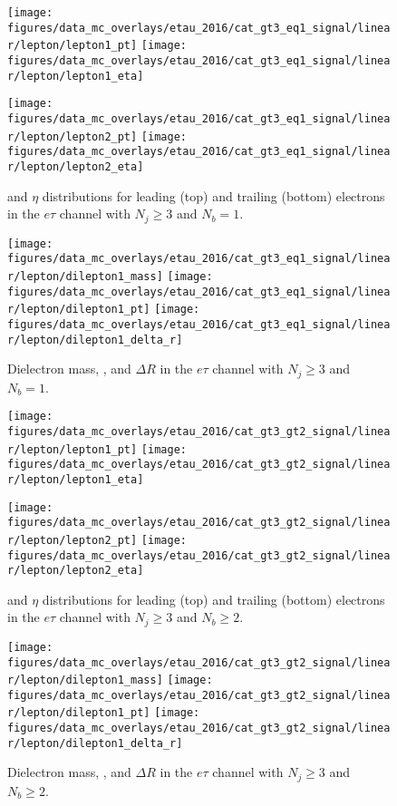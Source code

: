 \begin{figure}[htb!]
    \centering
    \texttt{[image: figures/data\_mc\_overlays/etau\_2016/cat\_gt3\_eq1\_signal/linear/lepton/lepton1\_pt]}
    \texttt{[image: figures/data\_mc\_overlays/etau\_2016/cat\_gt3\_eq1\_signal/linear/lepton/lepton1\_eta]}

    \texttt{[image: figures/data\_mc\_overlays/etau\_2016/cat\_gt3\_eq1\_signal/linear/lepton/lepton2\_pt]}
    \texttt{[image: figures/data\_mc\_overlays/etau\_2016/cat\_gt3\_eq1\_signal/linear/lepton/lepton2\_eta]}
    \caption{\pt and $\eta$ distributions for leading (top) and trailing
        (bottom) electrons in the $e\tau$ channel with $N_{j} \geq 3$ and
        $N_{b} = 1$.}
    \label{fig:etau_7_kinematic}
\end{figure}

\begin{figure}[htb!]
    \centering
    \texttt{[image: figures/data\_mc\_overlays/etau\_2016/cat\_gt3\_eq1\_signal/linear/lepton/dilepton1\_mass]}
    \texttt{[image: figures/data\_mc\_overlays/etau\_2016/cat\_gt3\_eq1\_signal/linear/lepton/dilepton1\_pt]}
    \texttt{[image: figures/data\_mc\_overlays/etau\_2016/cat\_gt3\_eq1\_signal/linear/lepton/dilepton1\_delta\_r]}
    \caption{Dielectron mass, \pt, and $\Delta R$ in the $e\tau$ channel
    with $N_{j} \geq 3$ and $N_{b} = 1$.}
    \label{fig:etau_7_dilepton}
\end{figure}

\begin{figure}[htb!]
    \centering
    \texttt{[image: figures/data\_mc\_overlays/etau\_2016/cat\_gt3\_gt2\_signal/linear/lepton/lepton1\_pt]}
    \texttt{[image: figures/data\_mc\_overlays/etau\_2016/cat\_gt3\_gt2\_signal/linear/lepton/lepton1\_eta]}

    \texttt{[image: figures/data\_mc\_overlays/etau\_2016/cat\_gt3\_gt2\_signal/linear/lepton/lepton2\_pt]}
    \texttt{[image: figures/data\_mc\_overlays/etau\_2016/cat\_gt3\_gt2\_signal/linear/lepton/lepton2\_eta]}
    \caption{\pt and $\eta$ distributions for leading (top) and trailing
        (bottom) electrons in the $e\tau$ channel with $N_{j} \geq 3$ and
        $N_{b} \geq 2$.}
    \label{fig:etau_8_kinematic}
\end{figure}

\begin{figure}[htb!]
    \centering
    \texttt{[image: figures/data\_mc\_overlays/etau\_2016/cat\_gt3\_gt2\_signal/linear/lepton/dilepton1\_mass]}
    \texttt{[image: figures/data\_mc\_overlays/etau\_2016/cat\_gt3\_gt2\_signal/linear/lepton/dilepton1\_pt]}
    \texttt{[image: figures/data\_mc\_overlays/etau\_2016/cat\_gt3\_gt2\_signal/linear/lepton/dilepton1\_delta\_r]}
    \caption{Dielectron mass, \pt, and $\Delta R$ in the $e\tau$ channel
        with $N_{j} \geq 3$ and $N_{b} \geq 2$.}
    \label{fig:etau_8_dilepton}
\end{figure}

